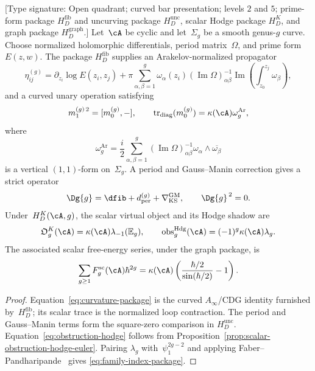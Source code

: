 \begin{proposition}
\label{prop:genus-g-curvature-package}
\textup{[Type signature: Open quadrant; curved bar presentation;
levels $2$ and $5$; prime-form package $H_D^{\mathrm{fib}}$ and
uncurving package $H_D^{\mathrm{unc}}$, scalar Hodge package $H_D^K$,
and graph package $H_D^{\mathrm{graph}}$.]}
Let~$\cA$ be cyclic and let~$\Sigma_g$ be a smooth genus-$g$ curve.
Choose normalized holomorphic differentials, period matrix~$\Omega$,
and prime form~$E(z,w)$.  The package $H_D^{\mathrm{fib}}$ supplies an
Arakelov-normalized propagator
\begin{equation}
 \eta_{ij}^{(g)}
 =\partial_{z_i}\log E(z_i,z_j)
 +\pi\sum_{\alpha,\beta=1}^g
 \omega_\alpha(z_i)(\operatorname{Im}\Omega)^{-1}_{\alpha\beta}
 \operatorname{Im}\!\left(\int_{z_0}^{z_j}\omega_\beta\right),
 \label{eq:propagator-package}
\end{equation}
and a curved unary operation satisfying
\begin{equation}
 m_1^{(g)\,2}=[m_0^{(g)},-],
 \qquad
 \operatorname{tr}_{\mathrm{diag}}(m_0^{(g)})
 =\kappa(\cA)\omega_g^{\mathrm{Ar}},
 \label{eq:curvature-package}
\end{equation}
where
\[
 \omega_g^{\mathrm{Ar}}
 =\frac{i}{2}\sum_{\alpha,\beta=1}^g
 (\operatorname{Im}\Omega)^{-1}_{\alpha\beta}
 \omega_\alpha\wedge\overline{\omega_\beta}
\]
is a vertical $(1,1)$-form on~$\Sigma_g$.  A period and
Gauss--Manin correction gives a strict operator
\[
 \Dg{g}=\dfib+d_{\mathrm{per}}^{(g)}
 +\nabla_{\mathrm{KS}}^{\mathrm{GM}},
 \qquad \Dg{g}^{\,2}=0.
\]
Under~$H_D^K(\cA,g)$, the scalar virtual object and its Hodge shadow
are
\begin{equation}
 \mathfrak O_g^K(\cA)=\kappa(\cA)\lambda_{-1}(\mathbb E_g),
 \qquad
 \operatorname{obs}^{\mathrm{Hdg}}_g(\cA)
 =(-1)^g\kappa(\cA)\lambda_g.
 \label{eq:obstruction-hodge}
\end{equation}
The associated scalar free-energy series, under the graph package, is
\begin{equation}
 \sum_{g\ge1}F_g^{\mathrm{sc}}(\cA)\hbar^{2g}
 =\kappa(\cA)\left(\frac{\hbar/2}{\sin(\hbar/2)}-1\right).
 \label{eq:family-index-package}
\end{equation}
\end{proposition}

\begin{proof}
Equation~\eqref{eq:curvature-package} is the curved
$A_\infty$/CDG identity furnished by~$H_D^{\mathrm{fib}}$; its
scalar trace is the normalized loop contraction.  The period and
Gauss--Manin terms form the square-zero comparison in
$H_D^{\mathrm{unc}}$.  Equation~\eqref{eq:obstruction-hodge} follows from
Proposition~\ref{prop:scalar-obstruction-hodge-euler}.  Pairing
$\lambda_g$ with~$\psi_1^{2g-2}$ and applying
Faber--Pandharipande~\cite{FP03} gives
\eqref{eq:family-index-package}.
\end{proof}


